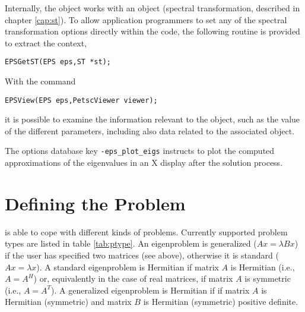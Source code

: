 	Internally, the  object works with an  object (spectral transformation, described in chapter \ref{cap:st}). To allow application programmers to set any of the spectral transformation options directly within the code, the following routine is provided to extract the  context,
	\begin{Verbatim}[fontsize=\small]
	EPSGetST(EPS eps,ST *st);
	\end{Verbatim}
	
	With the command
	\begin{Verbatim}[fontsize=\small]
	EPSView(EPS eps,PetscViewer viewer);
	\end{Verbatim}
it is possible to examine the information relevant to the  object, such as the value of the different parameters, including also data related to the associated  object.

	The options database key \Verb!-eps_plot_eigs! instructs \slepc to plot the computed approximations of the eigenvalues in an X display after the solution process.

\section{Defining the Problem}


	\slepc is able to cope with different kinds of problems. Currently supported problem types are listed in table \ref{tab:ptype}. An eigenproblem is generalized ($Ax=\lambda Bx$) if the user has specified two matrices (see  above), otherwise it is standard ($Ax=\lambda x$). A standard eigenproblem is Hermitian if matrix $A$ is Hermitian (i.e., $A=A^H$) or, equivalently in the case of real matrices, if matrix $A$ is symmetric (i.e., $A=A^T$). A generalized eigenproblem is Hermitian if if matrix $A$ is Hermitian (symmetric) and matrix $B$ is Hermitian (symmetric) positive definite.

